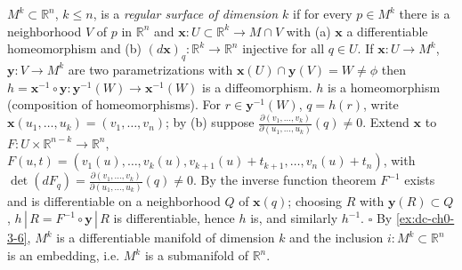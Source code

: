 \begin{example}
  \label{ex:dc-ch0-4-2}
  \notready
  $M^k\subset\mathbb{R}^n$, $k\le n$, is a \emph{regular surface of dimension $k$} if for
  every $p\in M^k$ there is a neighborhood $V$ of $p$ in $\mathbb{R}^n$ and
  $\mathbf{x}:U\subset\mathbb{R}^k\to M\cap V$ with (a) $\mathbf{x}$ a
  differentiable homeomorphism and (b) $(d\mathbf{x})_q:\mathbb{R}^k\to\mathbb{R}^n$
  injective for all $q\in U$. If
  $\mathbf{x}:U\to M^k$, $\mathbf{y}:V\to M^k$ are two parametrizations with
  $\mathbf{x}(U)\cap\mathbf{y}(V)=W\neq\phi$ then
  $h=\mathbf{x}^{-1}\circ\mathbf{y}:\mathbf{y}^{-1}(W)\to\mathbf{x}^{-1}(W)$ is a
  diffeomorphism.
  \sketch
  $h$ is a homeomorphism (composition of homeomorphisms). For
  $r\in\mathbf{y}^{-1}(W)$, $q=h(r)$, write
  $\mathbf{x}(u_1,\dots,u_k)=(v_1,\dots,v_n)$; by (b) suppose
  $\frac{\partial(v_1,\dots,v_k)}{\partial(u_1,\dots,u_k)}(q)\neq0$. Extend
  $\mathbf{x}$ to $F:U\times\mathbb{R}^{n-k}\to\mathbb{R}^n$,
  $F(u,t)=(v_1(u),\dots,v_k(u),v_{k+1}(u)+t_{k+1},\dots,v_n(u)+t_n)$, with
  $\det(dF_q)=\frac{\partial(v_1,\dots,v_k)}{\partial(u_1,\dots,u_k)}(q)\neq0$. By
  the inverse function theorem $F^{-1}$ exists and is differentiable on a
  neighborhood $Q$ of $\mathbf{x}(q)$; choosing $R$ with $\mathbf{y}(R)\subset Q$,
  $h\,|\,R=F^{-1}\circ\mathbf{y}\,|\,R$ is differentiable, hence $h$ is, and
  similarly $h^{-1}$. $\square$ By \cref{ex:dc-ch0-3-6}, $M^k$ is a differentiable
  manifold of dimension $k$ and the inclusion
  $i:M^k\subset\mathbb{R}^n$ is an embedding, i.e. $M^k$ is a submanifold of
  $\mathbb{R}^n$.
\end{example}

